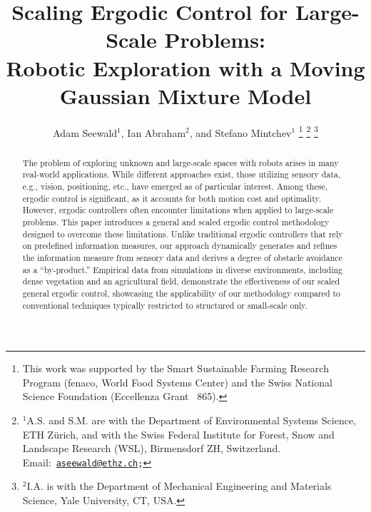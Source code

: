 \documentclass[letterpaper,10pt,conference,twoside]{IEEEtran}
\theoremstyle{definition}
\begin{document}

\title{\LARGE\bf Scaling Ergodic Control for Large-Scale Problems:\\Robotic Exploration with a Moving Gaussian Mixture Model}

\author{Adam Seewald${}^{\text{1}}$, Ian Abraham${}^{\text{2}}$, and Stefano Mintchev${}^{\text{1}}$
  \thanks{%
  This work was supported by the Smart Sustainable Farming Research Program (fenaco, World Food Systems Center) and the Swiss National Science Foundation (Eccellenza Grant ~865).}
  \thanks{${}^{\text{1}}$A.\hspace*{.4ex}S. and S.\hspace*{.4ex}M. are with the Department of Environmental Systems Science, ETH Z{\"u}rich, and with the Swiss Federal Institute for Forest, Snow and Landscape Research (WSL), Birmensdorf ZH, Switzerland. Email:~{\tt\footnotesize \href{mailto:aseewald@ethz.ch}{aseewald@ethz.ch};}}
  \thanks{${}^{\text{2}}$I.\hspace*{.4ex}A. is with the Department of Mechanical Engineering and Materials Science, Yale University, CT, USA.}
}

\maketitle

\begin{abstract}
  The problem of exploring unknown and large-scale spaces with robots arises in many real-world applications. While different approaches exist, those utilizing sensory data, e.g., vision, positioning, etc., have emerged as of particular interest. Among these, ergodic control is significant, as it accounts for both motion cost and optimality. However, ergodic controllers often encounter limitations when applied to large-scale problems. This paper introduces a general and scaled ergodic control methodology designed to overcome these limitations. Unlike traditional ergodic controllers that rely on predefined information measures, our approach dynamically generates and refines the information measure from sensory data and derives a degree of obstacle avoidance as a ``by-product.'' Empirical data from simulations in diverse environments, including dense vegetation and an agricultural field, demonstrate the effectiveness of our scaled general ergodic control, showcasing the applicability of our methodology compared to conventional techniques typically restricted to structured or small-scale only.
\end{abstract}
\end{document}
